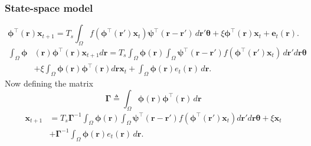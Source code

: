 \documentclass[compress]{beamer}
\begin{document}
\begin{frame} \frametitle{State-space model}
\begin{equation}
	\label{reduced continuous model}
	\boldsymbol{\phi}^{\top}(\mathbf{r})\mathbf{x}_{t+1} = T_s\int_\Omega{f(\boldsymbol{\phi}^{\top}(\mathbf{r}')\mathbf{x}_t )\boldsymbol{\psi}^{\top}(\mathbf{r}-\mathbf{r}') \, d\mathbf{r}'}\boldsymbol{\theta} + \xi\boldsymbol{\phi}^{\top}(\mathbf{r})\mathbf{x}_t + \mathbf{e}_t(\mathbf{r}). 
\end{equation}
\pause
\begin{align}
	\label{eq:decompRHS}
 	\int_\Omega \boldsymbol{\phi}&\left(\mathbf{r}\right) \boldsymbol{\phi}^{\top}(\mathbf{r})\mathbf{x}_{t+1} d\mathbf{r} = T_s \int_\Omega \boldsymbol{\phi} (\mathbf{r}) \int_\Omega \boldsymbol{\psi}^{\top} (\mathbf{r}-\mathbf{r}') f(\boldsymbol{\phi}^{\top}(\mathbf{r}') \mathbf{x}_t ) \, d\mathbf{r}'d\mathbf{r}\boldsymbol{\theta} \nonumber \\ 
	&+ \xi\int_\Omega {\boldsymbol{\phi}(\mathbf{r}) \boldsymbol{\phi}^{\top}(\mathbf{r})d\mathbf{r} } \mathbf{x}_t + \int_\Omega{\boldsymbol{\phi} (\mathbf{r}) e_t(\mathbf{r}) \, d\mathbf{r}}. 
\end{align}
\pause
Now defining the matrix
$$	\boldsymbol{\Gamma} \triangleq \int_\Omega {\boldsymbol{\phi} \left(\mathbf{r}\right)\boldsymbol{\phi} ^{\top}\left(\mathbf{r}\right) \, d\mathbf{r}} $$
\pause
\begin{align}
    \label{eq:ReducedForm}
	 \mathbf{x}_{t+1} &= T_s\boldsymbol{\Gamma}^{-1}
	 \int_\Omega \boldsymbol{\phi}(\mathbf{r}) 
	 \int_\Omega \boldsymbol{\psi}^{\top} (\mathbf{r}-\mathbf{r}')f(\boldsymbol{\phi}^{\top}(\mathbf{r}')\mathbf{x}_t)d\mathbf{r}' d\mathbf{r} \boldsymbol{\theta} + \xi\mathbf{x}_t \nonumber \\ &+ \boldsymbol{\Gamma}^{-1} \int_\Omega{\boldsymbol{\phi}(\mathbf{r}) e_t(\mathbf{r}) \, d\mathbf{r}}.
\end{align}
\end{frame}
\end{document}

